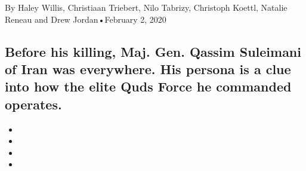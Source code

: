 By Haley Willis, Christiaan Triebert, Nilo Tabrizy, Christoph Koettl,
Natalie Reneau and Drew Jordan•February 2, 2020

\hypertarget{before-his-killing-maj-gen-qassim-suleimani-of-iran-was-everywhere-his-persona-is-a-clue-into-how-the-elite-quds-force-he-commanded-operates-1}{%
\subsection{Before his killing, Maj. Gen. Qassim Suleimani of Iran was
everywhere. His persona is a clue into how the elite Quds Force he
commanded
operates.}\label{before-his-killing-maj-gen-qassim-suleimani-of-iran-was-everywhere-his-persona-is-a-clue-into-how-the-elite-quds-force-he-commanded-operates-1}}

\begin{itemize}
\item
\item
\item
\item
\end{itemize}

